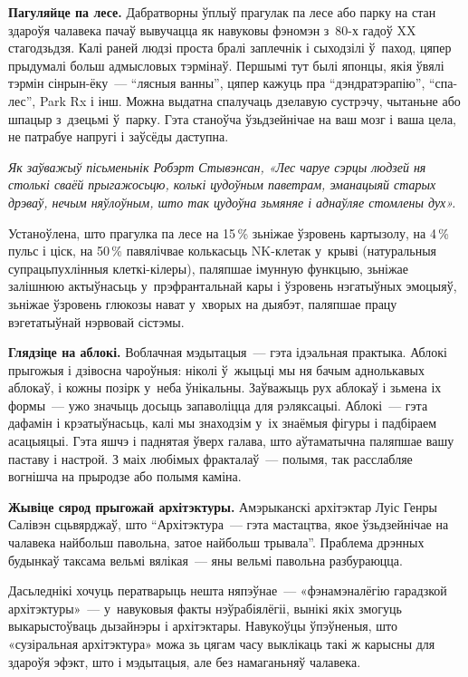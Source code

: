 \textbf{Пагуляйце па лесе.} Дабратворны ўплыў прагулак па лесе або парку на стан здароўя чалавека пачаў вывучацца як навуковы фэномэн з~80-х гадоў XX стагодзьдзя. Калі раней людзі проста бралі заплечнік і сыходзілі ў~паход, цяпер прыдумалі больш адмысловых тэрмінаў. Першымі тут былі японцы, якія ўвялі тэрмін сінрын-ёку~--- ``лясныя ванны'', цяпер кажуць пра ``дэндратэрапію'', ``спа-лес'', Park Rx і інш. Можна выдатна спалучаць дзелавую сустрэчу, чытаньне або шпацыр з~дзецьмі ў~парку. Гэта станоўча ўзьдзейнічае на ваш мозг і ваша цела, не патрабуе напругі і заўсёды даступна.

\emph{Як заўважыў пісьменьнік Робэрт Стывэнсан, «Лес чаруе сэрцы людзей ня столькі сваёй прыгажосьцю, колькі цудоўным паветрам, эманацыяй старых дрэваў, нечым няўлоўным, што так цудоўна зьмяняе і аднаўляе стомлены дух».}

Устаноўлена, што прагулка па лесе на 15\,\% зьніжае ўзровень картызолу, на 4\,\% пульс і ціск, на 50\,\% павялічвае колькасьць NK-клетак у~крыві (натуральныя супрацьпухлінныя клеткі-кілеры), паляпшае імунную функцыю, зьніжае залішнюю актыўнасьць у~прэфрантальнай кары і ўзровень нэгатыўных эмоцыяў, зьніжае ўзровень глюкозы нават у~хворых на дыябэт, паляпшае працу вэгетатыўнай нэрвовай сістэмы.

\textbf{Глядзіце на аблокі.} Воблачная мэдытацыя~--- гэта ідэальная практыка. Аблокі прыгожыя і дзівосна чароўныя: ніколі ў~жыцьці мы ня бачым аднолькавых аблокаў, і кожны позірк у~неба ўнікальны. Заўважыць рух аблокаў і зьмена іх формы~--- ужо значыць досыць запаволіцца для рэляксацыі. Аблокі~--- гэта дафамін і крэатыўнасьць, калі мы знаходзім у~іх знаёмыя фігуры і падбіраем асацыяцыі. Гэта яшчэ і паднятая ўверх галава, што аўтаматычна паляпшае вашу паставу і настрой. З маіх любімых фракталаў~--- полымя, так расслабляе вогнішча на прыродзе або полымя каміна.

\textbf{Жывіце сярод прыгожай архітэктуры.} Амэрыканскі архітэктар Луіс Генры Салівэн сцьвярджаў, што ``Архітэктура~--- гэта мастацтва, якое ўзьдзейнічае на чалавека найбольш павольна, затое найбольш трывала''. Праблема дрэнных будынкаў таксама вельмі вялікая~--- яны вельмі павольна разбураюцца. 

Дасьледнікі хочуць ператварыць нешта няпэўнае~--- «фэнамэналёгію гарадзкой архітэктуры»~--- у~навуковыя факты нэўрабіялёгіі, вынікі якіх змогуць выкарыстоўваць дызайнэры і архітэктары. Навукоўцы ўпэўненыя, што «сузіральная архітэктура» можа зь цягам часу выклікаць такі ж карысны для здароўя эфэкт, што і мэдытацыя, але без намаганьняў чалавека.

